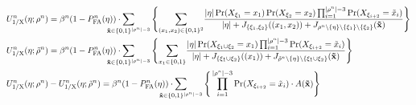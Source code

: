 \documentclass[journal,draftclsnofoot,onecolumn]{IEEEtran}
\theoremstyle{definition}
\newif\ifdoublecolumn
\begin{document}
\ifdoublecolumn
\else
\begin{figure*}
\normalsize
\begin{align}
U_\mathrm{1/X}^n(\eta ;\rho^n ) &=\beta ^n(1 - P_\mathrm{FA}^n(\eta ))\cdot\smashoperator[l]{\sum\limits_{\mathbf{\tilde{x}}  \in \{0,1\}^{|\rho^n | - 3}}}\Bigg\{{\sum_{(x_1,x_2)\in\{0,1\}^2}}\frac{|\eta|\Pr(X_{\xi_1}=x_1)\Pr(X_{\xi_2}=x_2)\prod _{i=1}^{|\rho^n|-3}\Pr(X_{\xi_{i+2}}=\tilde{x}_i)}{|\eta|+J_{\{\xi_1,\xi_2\}}((x_1,x_2))+J_{\rho^n\backslash\{\eta\}\backslash\{\xi_1\}\backslash\{\xi_2\}}(\mathbf{\tilde{x}})}\Bigg\}\label{Eq:NegExternalityBefore}\\
{U_\mathrm{1/X}^n(\eta ;\tilde \rho^n )} &=\beta ^n(1 - P_\mathrm{FA}^n(\eta ))\cdot\smashoperator[l]{\sum\limits_{\mathbf{\tilde{x}}  \in \{0,1\}^{|\rho^n | - 3}}}\Bigg\{{\sum_{x_1\in\{0,1\}}}\frac{|\eta|\Pr(X_{\xi_1\cup\xi_2}=x_1)\prod _{i=1}^{|\rho^n|-3}\Pr(X_{\xi_{i+2}}=\tilde{x}_i)}{|\eta|+J_{\{\xi_1\cup\xi_2\}}((x_1))+J_{\tilde\rho^n\backslash\{\eta\}\backslash\{\xi_1\cup\xi_2\} }(\mathbf{\tilde x})}\Bigg\}\label{Eq:NegExternalityAfter}\\
 U_\mathrm{1/X}^n(\eta ;\rho^n )&-U_\mathrm{1/X}^n(\eta ;\tilde\rho^n)=\beta ^n(1 - P_{{\mathrm{FA}}}^n(\eta ))\cdot\smashoperator[l]{\sum\limits_{\mathbf{\tilde{x}}  \in \{0,1\}^{|\rho^n | - 3}}} {\Bigg\{ \prod _{i=1}^{|\rho^n|-3}\Pr(X_{\xi_{i+2}}=\tilde{x}_i)\cdot A(\mathbf{\tilde{x}})  \Bigg\}} \label{Eq:NegExternalityProof}
\end{align}
\hrulefill
\vspace*{-10.2pt}
\label{Fig:Eq:NegExternalityBeforeAfter}
\end{figure*}
\fi

\appendices 
\end{document}
